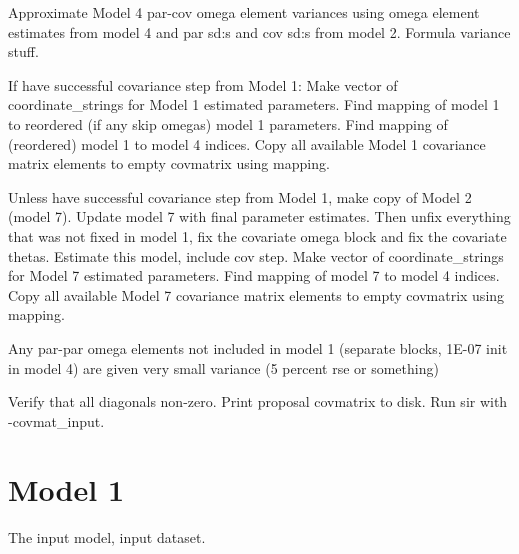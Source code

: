Approximate Model 4 par-cov omega element variances using omega element estimates from model 4 and
par sd:s and cov sd:s from model 2. Formula variance stuff.

If have successful covariance step from Model 1:
Make vector of coordinate\_strings for Model 1 estimated parameters.
Find mapping of model 1 to reordered (if any skip omegas) model 1 parameters.
Find mapping of (reordered) model 1 to model 4 indices.
Copy all available Model 1 covariance matrix elements to empty covmatrix using mapping.

Unless have successful covariance step from Model 1, make copy of Model 2 (model 7).
Update model 7 with final parameter estimates.
Then unfix everything that was
not fixed in model 1, fix the covariate omega block and fix the covariate thetas. 
Estimate this model, include cov step.
Make vector of coordinate\_strings for Model 7 estimated parameters.
Find mapping of model 7 to model 4 indices.
Copy all available Model 7 covariance matrix elements to empty covmatrix using mapping.

Any par-par omega elements not included in model 1 (separate blocks, 1E-07 init in model 4) are given very small variance (5 percent rse or something)

Verify that all diagonals non-zero. Print proposal covmatrix to disk.
Run sir with -covmat\_input.

\section{Model 1}
The input model, input dataset.

